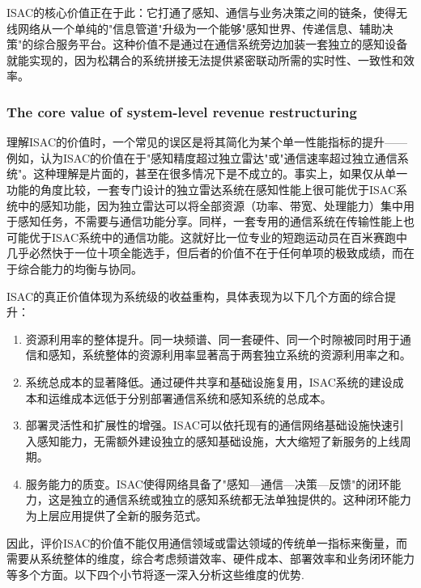ISAC的核心价值正在于此：它打通了感知、通信与业务决策之间的链条，使得无线网络从一个单纯的"信息管道"升级为一个能够"感知世界、传递信息、辅助决策"的综合服务平台。这种价值不是通过在通信系统旁边加装一套独立的感知设备就能实现的，因为松耦合的系统拼接无法提供紧密联动所需的实时性、一致性和效率。

\subsubsection{The core value of system-level revenue restructuring}
\label{subsubsec:ch1-isac-core value-revenue}

理解ISAC的价值时，一个常见的误区是将其简化为某个单一性能指标的提升——例如，认为ISAC的价值在于"感知精度超过独立雷达"或"通信速率超过独立通信系统"。这种理解是片面的，甚至在很多情况下是不成立的。事实上，如果仅从单一功能的角度比较，一套专门设计的独立雷达系统在感知性能上很可能优于ISAC系统中的感知功能，因为独立雷达可以将全部资源（功率、带宽、处理能力）集中用于感知任务，不需要与通信功能分享。同样，一套专用的通信系统在传输性能上也可能优于ISAC系统中的通信功能。这就好比一位专业的短跑运动员在百米赛跑中几乎必然快于一位十项全能选手，但后者的价值不在于任何单项的极致成绩，而在于综合能力的均衡与协同。

ISAC的真正价值体现为系统级的收益重构，具体表现为以下几个方面的综合提升：

\begin{enumerate}[label=(\arabic*)]
\item 资源利用率的整体提升。同一块频谱、同一套硬件、同一个时隙被同时用于通信和感知，系统整体的资源利用率显著高于两套独立系统的资源利用率之和。

\item 系统总成本的显著降低。通过硬件共享和基础设施复用，ISAC系统的建设成本和运维成本远低于分别部署通信系统和感知系统的总成本。

\item 部署灵活性和扩展性的增强。ISAC可以依托现有的通信网络基础设施快速引入感知能力，无需额外建设独立的感知基础设施，大大缩短了新服务的上线周期。

\item 服务能力的质变。ISAC使得网络具备了"感知—通信—决策—反馈"的闭环能力，这是独立的通信系统或独立的感知系统都无法单独提供的。这种闭环能力为上层应用提供了全新的服务范式。
\end{enumerate}

因此，评价ISAC的价值不能仅用通信领域或雷达领域的传统单一指标来衡量，而需要从系统整体的维度，综合考虑频谱效率、硬件成本、部署效率和业务闭环能力等多个方面。以下四个小节将逐一深入分析这些维度的优势.

